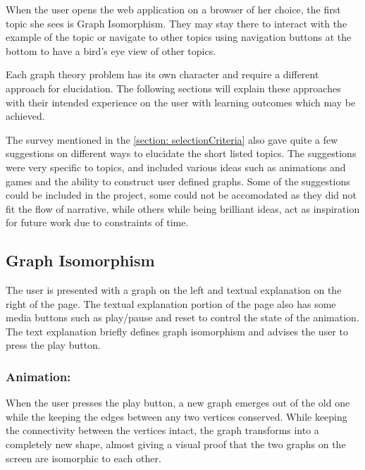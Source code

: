When the user opens the web application on a browser of her choice, the first
topic she sees is Graph Isomorphism. They may stay there to interact
with the example of the topic or navigate to other topics using navigation
buttons at the bottom to have a bird's eye view of other topics.

Each graph theory problem has its own character and require a different
approach for elucidation. The following sections will explain these approaches
with their intended experience on the user with learning outcomes which may be
achieved.

The survey mentioned in the \autoref{section: selectionCriteria} also gave
quite a few suggestions on different ways to elucidate the short listed topics.
The suggestions were very specific to topics, and included various ideas such as
animations and games and the ability to construct user defined graphs. Some
of the suggestions could be included in the project, some could not be
accomodated as they did not fit the flow of narrative, while others while being
brilliant ideas, act as inspiration for future work due to constraints of time.

\subsection{Graph Isomorphism}
\label{story: isomorphism}
The user is presented with a graph on the left and textual explanation on the
right of the page.  The textual explanation portion of the page also has some
media buttons such as play/pause and reset to control the state of the
animation. The text explanation briefly defines graph isomorphism and advises
the user to press the play button.

\subsubsection{Animation:}
When the user presses the play button, a new graph emerges out of the old one
while the keeping the edges between any two vertices conserved. 
While keeping the connectivity between the vertices intact, the graph
transforms into a completely new shape, almost giving a visual proof that the
two graphs on the screen are isomorphic to each other.

